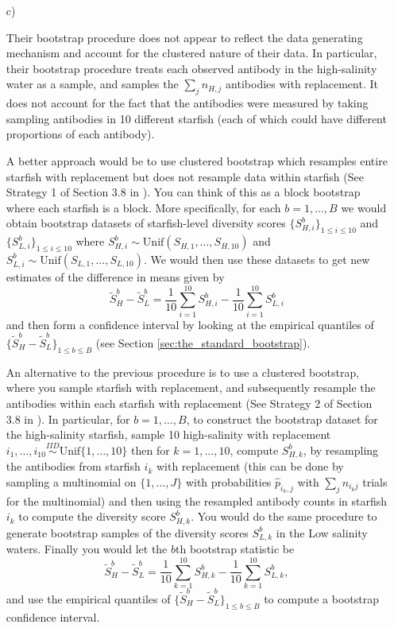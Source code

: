 \begin{enumerate}
\item[c)]

Their bootstrap procedure does not appear to reflect the data generating mechanism and account for the clustered nature of their data. In particular, their bootstrap procedure treats each observed antibody in the high-salinity water as a sample, and samples the $\sum_j n_{H,j}$ antibodies with replacement. It does not account for the fact that the antibodies were measured by taking sampling antibodies in 10 different starfish (each of which could have different proportions of each antibody).

A better approach would be to use clustered bootstrap which resamples entire starfish with replacement but does not resample data within starfish (See Strategy 1 of Section 3.8 in \cite{davison_hinkley_1997}). You can think of this as a block bootstrap where each starfish is a block.  More specifically, for each $b=1,\dots,B$ we would obtain bootstrap datasets of starfish-level diversity scores $\{ S_{H,i}^b\}_{1 \leq i \leq 10}$ and $\{ S_{L,i}^b\}_{1 \leq i \leq 10}$ where $ S_{H,i}^b \sim \text{Unif}( S_{H,1},\dots, S_{H,10})$ and $ S_{L,i}^b \sim \text{Unif}( S_{L,1},\dots, S_{L,10})$. We would then use these datasets to get new estimates of the difference in means given by $$\tilde{S}_H^b - \tilde{S}_L^b = \frac{1}{10} \sum_{i=1}^{10} S_{H,i}^b -  \frac{1}{10} \sum_{i=1}^{10} S_{L,i}^b$$ and then form a confidence interval by looking at the empirical quantiles of $\{\tilde{S}^b_H - \tilde{S}^b_L\}_{1 \leq b \leq B}$ (see Section \ref{sec:the_standard_bootstrap}).

An alternative to the previous procedure is to use a clustered bootstrap, where you sample starfish with replacement, and subsequently resample the antibodies within each starfish with replacement (See Strategy 2 of Section 3.8 in \cite{davison_hinkley_1997}). In particular, for $b=1,\dots, B$, to construct the bootstrap dataset for the high-salinity starfish, sample 10 high-salinity with replacement $i_1,\dots,i_{10}  \stackrel{IID}{\sim} \text{Unif} \{1,\dots,10 \}$ then for $k=1, \dots,10$, compute $S_{H,k}^b$, by resampling the antibodies from starfish $i_k$ with replacement (this can be done by sampling a multinomial on $\{1 , \dots ,J \}$ with probabilities $\hat{p}_{i_k,j}$ with $\sum_{j} n_{i_k j}$ trials for the multinomial) and then using the resampled antibody counts in starfish $i_k$ to compute the diversity score $S_{H,k}^b$. You would do the same procedure to generate bootstrap samples of the diversity scores $S_{L,k}^b$  in the Low salinity waters. Finally you would let the $b$th bootstrap statistic be  $$\tilde{S}_H^b - \tilde{S}_L^b=\frac{1}{10} \sum_{k=1}^{10} S_{H,k}^b -  \frac{1}{10} \sum_{k=1}^{10} S_{L,k}^b,$$ and use the empirical quantiles of $\{\tilde{S}^b_H - \tilde{S}^b_L\}_{1 \leq b \leq B}$ to compute a bootstrap confidence interval.


\end{enumerate}
